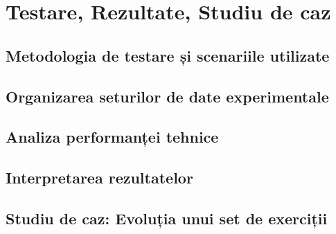 \chapter{Testare, Rezultate, Studiu de caz}
\section{Metodologia de testare și scenariile utilizate}
\section{Organizarea seturilor de date experimentale}
\section{Analiza performanței tehnice}
\section{Interpretarea rezultatelor }
\section{Studiu de caz: Evoluția unui set de exerciții}
